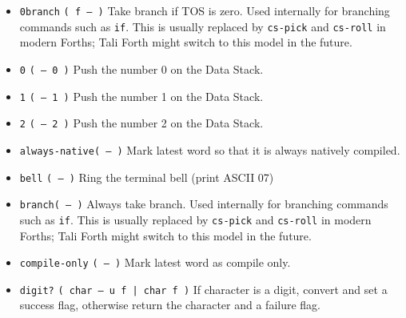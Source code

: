 \begin{itemize}

        \item \texttt{0branch} \texttt{( f -- )} 
                Take branch if TOS is zero. Used internally for branching
                commands such as \texttt{if}. This is
                usually replaced by
                \texttt{cs-pick} and 
                \texttt{cs-roll} in modern
                Forths; Tali Forth might switch to this model in the future.

        \item \texttt{0} \texttt{( -- 0 )} 
                Push the number 0 on the Data Stack.

        \item \texttt{1} \texttt{( -- 1 )} 
                Push the number 1 on the Data Stack.

        \item \texttt{2} \texttt{( -- 2 )} 
                Push the number 2 on the Data Stack.

        \item \texttt{always-native}\texttt{( -- )} 
                Mark latest word so that it is always natively compiled. 
   
        \item \texttt{bell} \texttt{( -- )} 
                Ring the terminal bell (print ASCII 07)

        \item \texttt{branch}\texttt{( -- )} 
                Always take branch. Used internally for branching commands such
                as \texttt{if}. This is usually replaced
                by \texttt{cs-pick} and
                \texttt{cs-roll} in modern
                Forths; Tali Forth might switch to this model in the future.

        \item \texttt{compile-only}
                \texttt{( -- )} Mark latest word as compile only.

        \item \texttt{digit?} 
                \texttt{( char -- u f | char f )} If character is a digit,
                convert and set a success flag, otherwise return the character
                and a failure flag.


\end{itemize}
